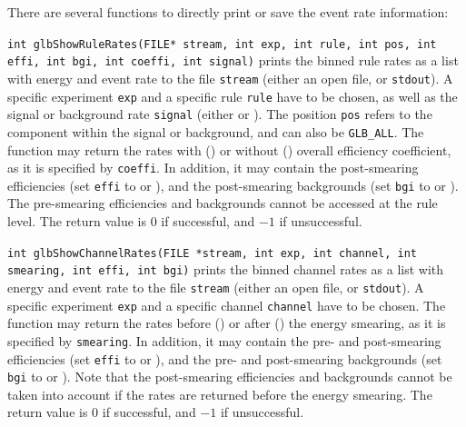 There are several functions to directly print or save the event rate
information:
\begin{function}
{\tt int glbShowRuleRates(FILE* stream, int exp, int rule, int pos,
int effi, int bgi, int coeffi, int signal)} prints the binned rule rates as
a list with energy and event rate to the file {\tt stream} (either an
open file, or {\tt stdout}). A specific experiment {\tt exp} and a 
specific rule {\tt rule} have to be chosen, as well as the signal
or background rate {\tt signal} (either  or ).
The position {\tt pos} refers to the component within the signal or 
background, and can also be {\tt GLB\_ALL}. The function may return
the rates with () or without ()
overall efficiency coefficient, as it is specified by {\tt coeffi}. 
In addition, it may contain the post-smearing efficiencies (set
{\tt effi} to  or ), and the
post-smearing backgrounds (set
{\tt bgi} to  or ). The pre-smearing
efficiencies and backgrounds cannot be accessed at the rule level.
The return value
is $0$ if successful, and $-1$ if unsuccessful.
\end{function}
\begin{function}
{\tt int glbShowChannelRates(FILE *stream,
int exp, int channel, int smearing, int effi, int bgi)}
prints the binned channel rates as
a list with energy and event rate to the file {\tt stream} (either an
open file, or {\tt stdout}). A specific experiment {\tt exp} and a 
specific channel {\tt channel} have to be chosen.
The function may return
the rates before () or after ()
the energy smearing, as it is specified by {\tt smearing}.
In addition, it may contain the pre- and post-smearing efficiencies (set
{\tt effi} to  or ), and the
pre- and post-smearing backgrounds (set
{\tt bgi} to  or ). Note that
the post-smearing efficiencies and backgrounds cannot be taken into
account if the rates are returned before the energy smearing.
The return value
is $0$ if successful, and $-1$ if unsuccessful.
\end{function}

